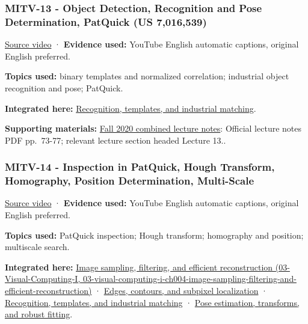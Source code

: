 \subsubsection{MITV-13 - Object Detection, Recognition and Pose Determination, PatQuick (US 7,016,539)}\label{04-visual-computing-ii-ch036-mitv-13---object-detection-recognition-and-pose-determination-patquick-us-7016539}

\href{https://www.youtube.com/watch?v=lVfm6C51t_Y}{Source video} · \textbf{Evidence used:} YouTube English automatic captions, original English preferred.

\textbf{Topics used:} binary templates and normalized correlation; industrial object recognition and pose; PatQuick.

\textbf{Integrated here:} \hyperref[04-visual-computing-ii-ch030-recognition-templates-and-industrial-matching]{Recognition, templates, and industrial matching}.

\textbf{Supporting materials:} \href{https://ocw.mit.edu/courses/6-801-machine-vision-fall-2020/9ec44f69e72995c370b3797818ba01e6_MIT6_801F20_lectureNotes.pdf}{Fall 2020 combined lecture notes}: Official lecture notes PDF pp.~73-77; relevant lecture section headed Lecture 13..

\subsubsection{MITV-14 - Inspection in PatQuick, Hough Transform, Homography, Position Determination, Multi-Scale}\label{04-visual-computing-ii-ch036-mitv-14---inspection-in-patquick-hough-transform-homography-position-determination-multi-scale}

\href{https://www.youtube.com/watch?v=6SvDRpQeZrA}{Source video} · \textbf{Evidence used:} YouTube English automatic captions, original English preferred.

\textbf{Topics used:} PatQuick inspection; Hough transform; homography and position; multiscale search.

\textbf{Integrated here:} \href{../03-Visual-Computing-I/main.pdf\#nameddest=03-visual-computing-i-ch004-image-sampling-filtering-and-efficient-reconstruction}{Image sampling, filtering, and efficient reconstruction (03-Visual-Computing-I, 03-visual-computing-i-ch004-image-sampling-filtering-and-efficient-reconstruction)} · \hyperref[04-visual-computing-ii-ch030-edges-contours-and-subpixel-localization]{Edges, contours, and subpixel localization} · \hyperref[04-visual-computing-ii-ch030-recognition-templates-and-industrial-matching]{Recognition, templates, and industrial matching} · \hyperref[04-visual-computing-ii-ch032-pose-estimation-transforms-and-robust-fitting]{Pose estimation, transforms, and robust fitting}.

